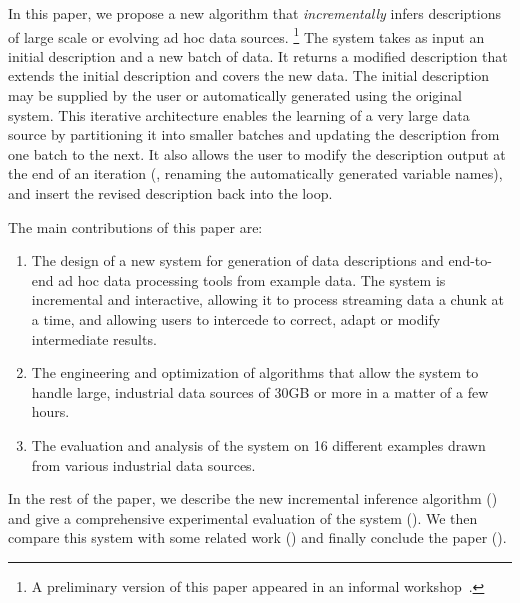 In this paper, we propose a new algorithm that {\em incrementally} infers 
descriptions of large scale or evolving ad hoc data sources. 
\footnote{A preliminary version of this paper appeared in an informal workshop~\cite{wasl09:zhu+}.}
The system takes as input an initial description 
and a new batch of data. It returns a
modified description that extends the initial description and covers the new 
data. The initial description may be supplied by the user or automatically
generated using the original \learnpads{} system. This iterative architecture
enables the learning of a very large data source by partitioning it 
into smaller batches and updating the description from one batch to the next. 
It also allows the user to modify the description output at the end of
an iteration (\eg{}, renaming the automatically generated variable names), 
and insert the revised description back into the loop.

The main contributions of this paper are:
\begin{enumerate}
\item The design of a new system for generation of data descriptions
and end-to-end ad hoc data processing tools from example data.  
The system is incremental and interactive, allowing it to process
streaming data a chunk at a time, and allowing users to intercede
to correct, adapt or modify intermediate results. 
\item The engineering and optimization of algorithms that allow
the system to handle large, industrial data sources of 30GB or
more in a matter of a few hours.
\item The evaluation and analysis of the system
on 16 different examples drawn from
various industrial data sources.
\end{enumerate}


In the rest of the paper, 
we describe the new incremental inference algorithm ()
and give a comprehensive experimental evaluation of the system 
(). We then compare this
system with some related work () and finally conclude
the paper ().
